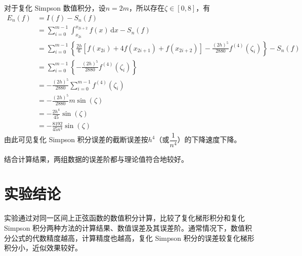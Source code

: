 \documentclass[11pt]{article}
\begin{document}
对于复化 Simpson 数值积分，设$n = 2m$，所以存在$\zeta \in [0, 8]$，有
\begin{align*}
    E_n(f) & = I(f) - S_n(f)                                                                                                                                     \\
           & = \sum_{i = 0}^{m - 1}\int_{x_{2i}}^{x_{2i+2}}\!f(x)\,\text{d}x - S_n(f)                                                                            \\
           & = \sum_{i = 0}^{m - 1}\left\{\frac{2h}{6}\left[f(x_{2i}) + 4f(x_{2i+1}) + f(x_{2i+2})\right] - \frac{(2h)^5}{2880}f^{(4)}(\zeta_i)\right\} - S_n(f) \\
           & = \sum_{i = 0}^{m - 1}\left\{- \frac{(2h)^5}{2880}f^{(4)}(\zeta_i)\right\}                                                                          \\
           & = - \frac{(2h)^5}{2880}\sum_{i = 0}^{m - 1}f^{(4)}(\zeta_i)                                                                                         \\
           & = - \frac{(2h)^5}{2880} m \sin(\zeta)                                                                                                               \\
           & = - \frac{2h^4}{45}\sin(\zeta)                                                                                                                      \\
           & = - \frac{8192}{45n^4}\sin(\zeta)
\end{align*}
由此可见复化 Simpson 积分误差的截断误差按$h^4$（或$\dfrac{1}{n^4}$）的下降速度下降。

结合计算结果，两组数据的误差阶都与理论值符合地较好。

\section{实验结论}
实验通过对同一区间上正弦函数的数值积分计算，比较了复化梯形积分和复化 Simpson 积分两种方法的计算结果、数值误差及其误差阶。通常情况下，数值积分公式的代数精度越高，计算精度也越高，复化 Simpson 积分的误差较复化梯形积分小，近似效果较好。
\end{document}
